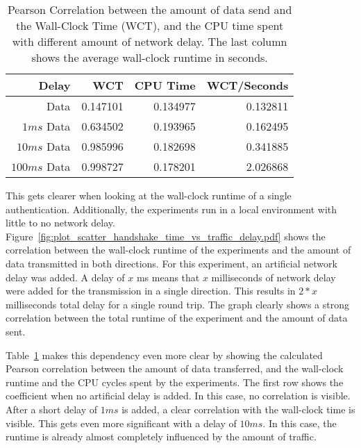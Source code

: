 \begin{table}[bh!]
    \caption{Pearson Correlation between the amount of data send and the Wall-Clock Time (WCT), and the \acs{CPU} time spent with different amount of network delay. The last column shows the average wall-clock runtime in seconds.}     
    \begin{center}
        \begin{tabular}{rrrr}
            \hline
            \textbf{Delay} & \textbf{WCT} & \textbf{\acs{CPU} Time} & \textbf{WCT/Seconds} \\
            \hline
            Data & 0.147101 & 0.134977 & 0.132811 \\
            \hline
            \(1ms\) Data & 0.634502 & 0.193965 & 0.162495 \\
            \hline
            \(10ms\) Data & 0.985996 & 0.182698 & 0.341885 \\
            \hline
            \(100ms\) Data & 0.998727 & 0.178201 & 2.026868  \\
            \hline
        \end{tabular}
    \end{center}
    \label{table:peason_delay}
\end{table}


This gets clearer when looking at the wall-clock runtime of a single authentication. Additionally, the experiments run in a local environment with little to no network delay. Figure~\ref{fig:plot_scatter_handshake_time_vs_traffic_delay.pdf} shows the correlation between the wall-clock runtime of the experiments and the amount of data transmitted in both directions. For this experiment, an artificial network delay was added. A delay of \(x\) ms means that \(x\) milliseconds of network delay were added for the transmission in a single direction. This results in \(2*x\) milliseconds total delay for a single round trip. The graph clearly shows a strong correlation between the total runtime of the experiment and the amount of data sent.




Table~\ref{table:peason_delay} makes this dependency even more clear by showing the calculated Pearson correlation between the amount of data transferred, and the wall-clock runtime and the \acs{CPU} cycles spent by the experiments. The first row shows the coefficient when no artificial delay is added. In this case, no correlation is visible. After a short delay of \(1ms\) is added, a clear correlation with the wall-clock time is visible. This gets even more significant with a delay of \(10ms\). In this case, the runtime is already almost completely influenced by the amount of traffic.


